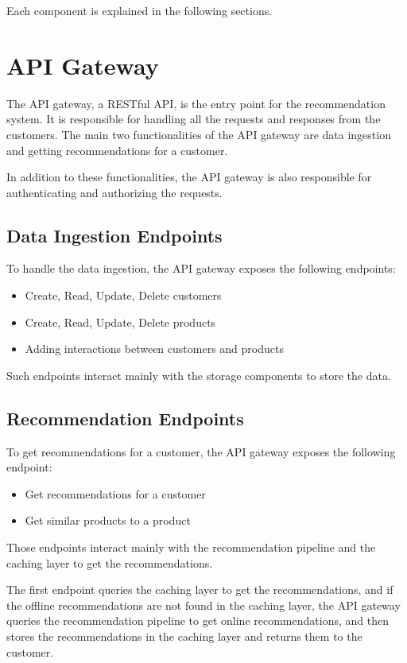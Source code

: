 Each component is explained in the following sections.

\section{API Gateway}

The API gateway, a RESTful API, is the entry point for the recommendation system.
It is responsible for handling all the requests and responses from the customers.
The main two functionalities of the API gateway are data ingestion and getting recommendations for a customer.

In addition to these functionalities, the API gateway is also responsible for authenticating and authorizing the requests.

\subsection{Data Ingestion Endpoints}

To handle the data ingestion, the API gateway exposes the following endpoints:
\begin{itemize}
    \item Create, Read, Update, Delete customers
    \item Create, Read, Update, Delete products
    \item Adding interactions between customers and products
\end{itemize}

Such endpoints interact mainly with the storage components to store the data.

\subsection{Recommendation Endpoints}

To get recommendations for a customer, the API gateway exposes the following endpoint:
\begin{itemize}
    \item Get recommendations for a customer
    \item Get similar products to a product
\end{itemize}

Those endpoints interact mainly with the recommendation pipeline and the caching layer to get the recommendations.

The first endpoint queries the caching layer to get the recommendations, and if the offline recommendations are not found in the caching layer, 
the API gateway queries the recommendation pipeline to get online recommendations, and then stores the recommendations in the caching layer and returns them to the customer.

